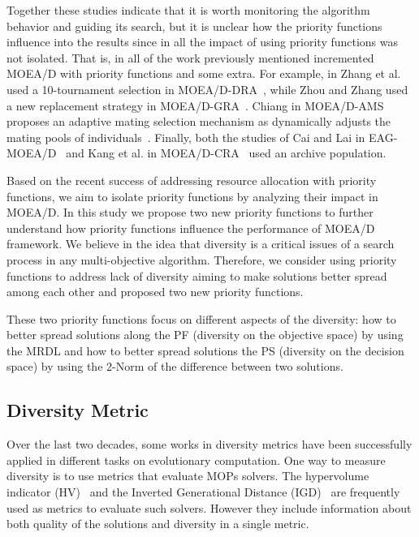 Together these studies indicate that it is worth monitoring the algorithm behavior and guiding its search, but it is unclear how the priority functions influence into the results since in all the impact of using priority functions was not isolated. That is, in all of the work previously mentioned incremented MOEA/D with priority functions and some extra. For example, in Zhang et al. used a 10-tournament selection in MOEA/D-DRA~\cite{zhang2009performance}, while Zhou and Zhang used a new replacement strategy in MOEA/D-GRA~\cite{zhou2016all}. Chiang in MOEA/D-AMS proposes an adaptive mating selection mechanism as dynamically adjusts the mating pools of individuals~\cite{chiang2011moea}. Finally, both the studies of Cai and Lai in  EAG-MOEA/D~\cite{cai2015external} and Kang et al. in MOEA/D-CRA~\cite{kang2018collaborative} used an archive population.

Based on the recent success of addressing resource allocation with priority functions, we aim to isolate priority functions by analyzing their impact in MOEA/D. In this study we propose two new priority functions to further understand how priority functions influence the performance of MOEA/D framework. We believe in the idea that diversity is a critical issues of a search process in any multi-objective algorithm. Therefore, we consider using priority functions to address lack of diversity aiming to make solutions better spread among each other and proposed two new priority functions. 

These two priority functions focus on different aspects of the diversity:  how to better spread solutions along the PF (diversity on the objective space) by using the MRDL and how to better spread solutions the PS (diversity on the decision space) by using the 2-Norm of the difference between two solutions.



\subsection{Diversity Metric}


Over the last two decades, some works in diversity metrics have been successfully applied in different tasks on evolutionary computation. One way to measure diversity is to use metrics that evaluate MOPs solvers. The hypervolume indicator (HV)~\cite{zitzler1998multiobjective} and the Inverted Generational Distance (IGD)~\cite{zhang2008rm} are frequently used as metrics to evaluate such solvers. However they include information about both quality of the solutions and diversity in a single metric.

